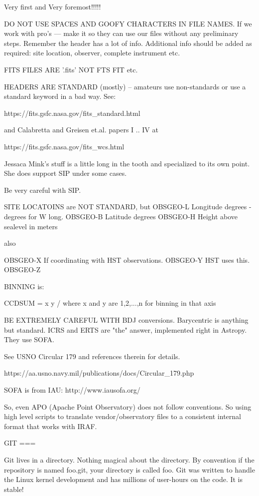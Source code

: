 Very first and Very foremost!!!!!

DO NOT USE SPACES AND GOOFY CHARACTERS IN FILE NAMES. If we
work with pro's --- make it so they can use our files without
any preliminary steps. Remember the header has a lot of info.
Additional info should be added as required: site location,
observer, complete instrument etc.

FITS FILES ARE '.fits' NOT FTS FIT etc.

HEADERS ARE STANDARD (mostly) -- amateurs use non-standards or use a
standard keyword in a bad way. See:

https://fits.gsfc.nasa.gov/fits_standard.html

and Calabretta and Greisen et.al. papers I .. IV at

https://fits.gsfc.nasa.gov/fits_wcs.html

Jessaca Mink's stuff is a little long in the tooth and specialized
to its own point. She does support SIP under some cases.

Be very careful with SIP.

SITE LOCATOINS are NOT STANDARD, but 
OBSGEO-L  Longitude  degrees -degrees for W long.
OBSGEO-B  Latitude  degrees
OBSGEO-H  Height above sealevel in meters

also

OBSGEO-X  If coordinating with HST observations.
OBSGEO-Y  HST uses this.
OBSGEO-Z

BINNING is:

CCDSUM  = x y / where x and y are 1,2,...,n for binning in that axis

BE EXTREMELY CAREFUL WITH BDJ conversions. Barycentric is anything but
standard. ICRS and ERTS are "the" answer, implemented right in Astropy.
They use SOFA.

See USNO Circular 179 and references therein for details.

https://aa.usno.navy.mil/publications/docs/Circular_179.php

SOFA is from IAU:   http://www.iausofa.org/


So, even APO (Apache Point Observatory) does not follow conventions.
So using high level scripts to translate vendor/observatory
files to a consistent internal format that works with IRAF.

GIT
===

Git lives in a directory. Nothing magical about the directory. By
convention if the repository is named foo.git, your directory is
called foo. Git was written to handle the Linux kernel development
and has millions of user-hours on the code. It is stable!

